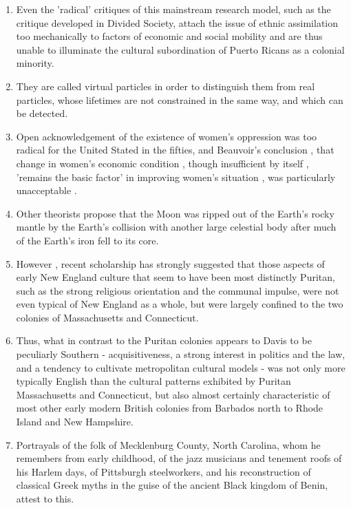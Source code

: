 \begin{enumerate}
\item Even the 'radical' critiques of this mainstream research model, such as the critique developed in Divided Society, attach the issue of ethnic assimilation too mechanically to factors of economic and social mobility and are thus unable to illuminate the cultural subordination of Puerto Ricans as a colonial minority. 

\item They are called virtual particles in order to distinguish them from real
particles, whose lifetimes are not constrained in the same way, and which can be detected. 

\item Open acknowledgement of the existence of women's oppression was too
radical for the United Stated in the fifties, and Beauvoir's conclusion , that change in women's economic condition , though insufficient by itself , 'remains the basic factor' in improving women's situation , was particularly unacceptable .

\item Other theorists propose that the Moon was ripped out of the Earth's rocky 
mantle by the Earth's collision with another large celestial body after much of the Earth's iron fell to its core. 

\item However , recent scholarship has strongly suggested that those aspects of
early New England culture that seem to have been most distinctly Puritan, such as the strong religious orientation and the communal impulse, were not even typical of New England as a whole, but were largely confined to the two colonies of Massachusetts and Connecticut.

\item Thus, what in contrast to the Puritan colonies appears to Davis to be peculiarly Southern -  acquisitiveness, a strong interest in politics and the law, and a tendency to cultivate metropolitan cultural models - was not only more typically English than the cultural  patterns exhibited by Puritan Massachusetts and Connecticut, but also almost certainly characteristic of most other early modern British colonies from Barbados north to Rhode  Island and New Hampshire. 

\item Portrayals of the folk of Mecklenburg County, North Carolina, whom he
remembers from early childhood, of the jazz musicians and tenement roofs of his Harlem days, of Pittsburgh steelworkers, and his reconstruction of classical Greek myths in the guise of the ancient Black kingdom of Benin, attest to this.


\end{enumerate}
